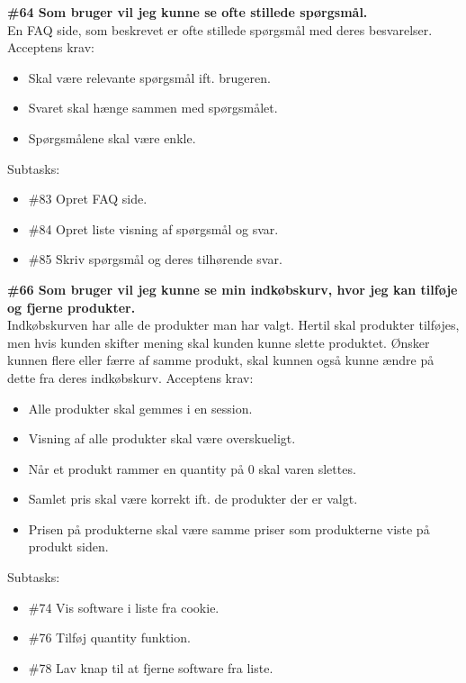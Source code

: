 \documentclass[11pt]{report}
\begin{document}
\noindent\textbf{\#64 Som bruger vil jeg kunne se ofte stillede spørgsmål.}\\
\noindent En FAQ side, som beskrevet er ofte stillede spørgsmål med deres besvarelser.
\noindent Acceptens krav:
\begin{itemize}[topsep=0pt, partopsep=0pt]
  \item Skal være relevante spørgsmål ift. brugeren.
  \item Svaret skal hænge sammen med spørgsmålet.
  \item Spørgsmålene skal være enkle.
\end{itemize}
\noindent Subtasks:
\begin{itemize}[topsep=0pt, partopsep=0pt]
  \item \#83 Opret FAQ side.
  \item \#84 Opret liste visning af spørgsmål og svar.
  \item \#85 Skriv spørgsmål og deres tilhørende svar.
\end{itemize}

\noindent\textbf{\#66 Som bruger vil jeg kunne se min indkøbskurv, hvor jeg kan tilføje og fjerne produkter.}\\
\noindent Indkøbskurven har alle de produkter man har valgt. Hertil skal produkter tilføjes, men hvis kunden skifter mening skal kunden kunne slette produktet. Ønsker kunnen flere eller færre af samme produkt, skal kunnen også kunne ændre på dette fra deres indkøbskurv.
\noindent Acceptens krav:
\begin{itemize}[topsep=0pt, partopsep=0pt]
  \item Alle produkter skal gemmes i en session.
  \item Visning af alle produkter skal være overskueligt.
  \item Når et produkt rammer en quantity på 0 skal varen slettes.
  \item Samlet pris skal være korrekt ift. de produkter der er valgt.
  \item Prisen på produkterne skal være samme priser som produkterne viste på produkt siden.
\end{itemize}
\newpage
\noindent Subtasks:
\begin{itemize}[topsep=0pt, partopsep=0pt]
  \item \#74 Vis software i liste fra cookie.
  \item \#76 Tilføj quantity funktion.
  \item \#78 Lav knap til at fjerne software fra liste.
\end{itemize}
\end{document}
